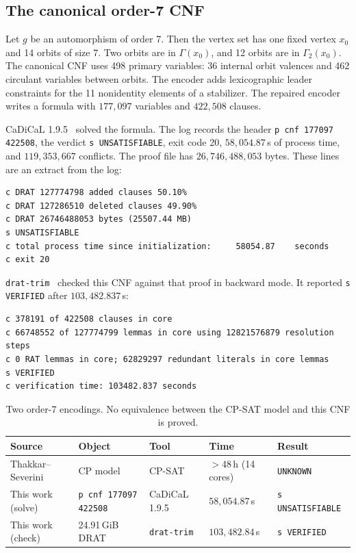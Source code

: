 \documentclass[pdflatex,sn-mathphys-num]{sn-jnl}
\theoremstyle{thmstyleone}
\theoremstyle{thmstyletwo}
\theoremstyle{thmstylethree}
\numberwithin{equation}{section}
\begin{document}
\subsection{The canonical order-7 CNF}
\label{sec:order7}

Let $g$ be an automorphism of order 7. Then the vertex set has one fixed vertex $x_0$ and 14 orbits of size 7. Two orbits are in $\Gamma(x_0)$, and 12 orbits are in $\Gamma_2(x_0)$. The canonical CNF uses 498 primary variables: 36 internal orbit valences and 462 circulant variables between orbits. The encoder adds lexicographic leader constraints for the 11 nonidentity elements of a stabilizer. The repaired encoder writes a formula with $177{,}097$ variables and $422{,}508$ clauses.

CaDiCaL 1.9.5~\cite{biere2019cadical} solved the formula. The log records the header \texttt{p cnf 177097 422508}, the verdict \texttt{s UNSATISFIABLE}, exit code 20, $58{,}054.87$\,s of process time, and $119{,}353{,}667$ conflicts. The proof file has $26{,}746{,}488{,}053$ bytes. These lines are an extract from the log:
\begin{lstlisting}
c DRAT 127774798 added clauses 50.10%
c DRAT 127286510 deleted clauses 49.90%
c DRAT 26746488053 bytes (25507.44 MB)
s UNSATISFIABLE
c total process time since initialization:     58054.87    seconds
c exit 20
\end{lstlisting}
\texttt{drat-trim}~\cite{heule2013verifying} checked this CNF against that proof in backward mode. It reported \texttt{s VERIFIED} after $103{,}482.837$\,s:
\begin{lstlisting}
c 378191 of 422508 clauses in core
c 66748552 of 127774799 lemmas in core using 12821576879 resolution steps
c 0 RAT lemmas in core; 62829297 redundant literals in core lemmas
s VERIFIED
c verification time: 103482.837 seconds
\end{lstlisting}

\begin{table}[ht]
\centering
\footnotesize
\setlength{\tabcolsep}{3.5pt}
\caption{Two order-7 encodings. No equivalence between the CP-SAT model and this CNF is proved.}
\label{tab:order7_benchmark}
\begin{tabular}{@{}lllll@{}}
\toprule
Source & Object & Tool & Time & Result \\
\midrule
Thakkar--Severini~\cite{thakkar2026forced} & CP model & CP-SAT & $>48$\,h (14 cores) & \texttt{UNKNOWN} \\
This work (solve) & \texttt{p cnf 177097 422508} & CaDiCaL 1.9.5 & $58{,}054.87$\,s & \texttt{s UNSATISFIABLE} \\
This work (check) & 24.91\,GiB DRAT & \texttt{drat-trim} & $103{,}482.84$\,s & \texttt{s VERIFIED} \\
\bottomrule
\end{tabular}
\end{table}
\end{document}

